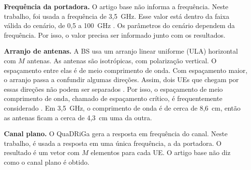 \textbf{Frequência da portadora.} O artigo base não informa a frequência. Neste trabalho, foi usada a frequência de 3,5~GHz. Esse valor está dentro da faixa válida do cenário, de 0,5 a 100~GHz \cite{tr38901}. Os parâmetros do cenário dependem da frequência. Por isso, o valor precisa ser informado junto com os resultados.

\textbf{Arranjo de antenas.} A BS usa um arranjo linear uniforme (ULA) horizontal com $M$ antenas. As antenas são isotrópicas, com polarização vertical. O espaçamento entre elas é de meio comprimento de onda. Com espaçamento maior, o arranjo passa a confundir algumas direções. Assim, dois UEs que chegam por essas direções não podem ser separados \cite[p.~354]{bjornson-mimo}. Por isso, o espaçamento de meio comprimento de onda, chamado de espaçamento crítico, é frequentemente considerado \cite[p.~354]{bjornson-mimo}. Em 3,5~GHz, o comprimento de onda é de cerca de 8,6~cm, então as antenas ficam a cerca de 4,3~cm uma da outra.

\textbf{Canal plano.} O QuaDRiGa gera a resposta em frequência do canal. Neste trabalho, é usada a resposta em uma única frequência, a da portadora. O resultado é um vetor com $M$ elementos para cada UE. O artigo base não diz como o canal plano é obtido.

